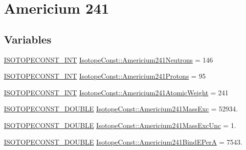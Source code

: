 \hypertarget{group___isotope_const-_americium-_am241}{}\section{Americium 241}
\label{group___isotope_const-_americium-_am241}
\subsection*{Variables}
\begin{DoxyCompactItemize}
\item 
\mbox{\hyperlink{group___isotope_const-_macros_ga5f18360b3e99483a35c32d789e62621c}{I\+S\+O\+T\+O\+P\+E\+C\+O\+N\+S\+T\+\_\+\+I\+NT}} \mbox{\hyperlink{group___isotope_const-_americium-_am241_gaa811412603b8766fab6dc62ae6167ed0}{Isotope\+Const\+::\+Americium241\+Neutrons}} = 146
\item 
\mbox{\hyperlink{group___isotope_const-_macros_ga5f18360b3e99483a35c32d789e62621c}{I\+S\+O\+T\+O\+P\+E\+C\+O\+N\+S\+T\+\_\+\+I\+NT}} \mbox{\hyperlink{group___isotope_const-_americium-_am241_ga26859e4ef3d29fc3cdbf6ca12315d563}{Isotope\+Const\+::\+Americium241\+Protons}} = 95
\item 
\mbox{\hyperlink{group___isotope_const-_macros_ga5f18360b3e99483a35c32d789e62621c}{I\+S\+O\+T\+O\+P\+E\+C\+O\+N\+S\+T\+\_\+\+I\+NT}} \mbox{\hyperlink{group___isotope_const-_americium-_am241_gaa33bc8b4fb06767cedafef9e2756fad4}{Isotope\+Const\+::\+Americium241\+Atomic\+Weight}} = 241
\item 
\mbox{\hyperlink{group___isotope_const-_macros_ga8f45a7272ce02c0b4c65c44636ed719a}{I\+S\+O\+T\+O\+P\+E\+C\+O\+N\+S\+T\+\_\+\+D\+O\+U\+B\+LE}} \mbox{\hyperlink{group___isotope_const-_americium-_am241_ga536fccfa82398506ad877d0875da2223}{Isotope\+Const\+::\+Americium241\+Mass\+Exc}} = 52934.
\item 
\mbox{\hyperlink{group___isotope_const-_macros_ga8f45a7272ce02c0b4c65c44636ed719a}{I\+S\+O\+T\+O\+P\+E\+C\+O\+N\+S\+T\+\_\+\+D\+O\+U\+B\+LE}} \mbox{\hyperlink{group___isotope_const-_americium-_am241_gade825c8f3ac0fd0586fce40ed70dff7f}{Isotope\+Const\+::\+Americium241\+Mass\+Exc\+Unc}} = 1.
\item 
\mbox{\hyperlink{group___isotope_const-_macros_ga8f45a7272ce02c0b4c65c44636ed719a}{I\+S\+O\+T\+O\+P\+E\+C\+O\+N\+S\+T\+\_\+\+D\+O\+U\+B\+LE}} \mbox{\hyperlink{group___isotope_const-_americium-_am241_gaff4e66015a67c0a00f20d64552392d14}{Isotope\+Const\+::\+Americium241\+Bind\+E\+PerA}} = 7543.
\item 

\end{DoxyCompactItemize}
